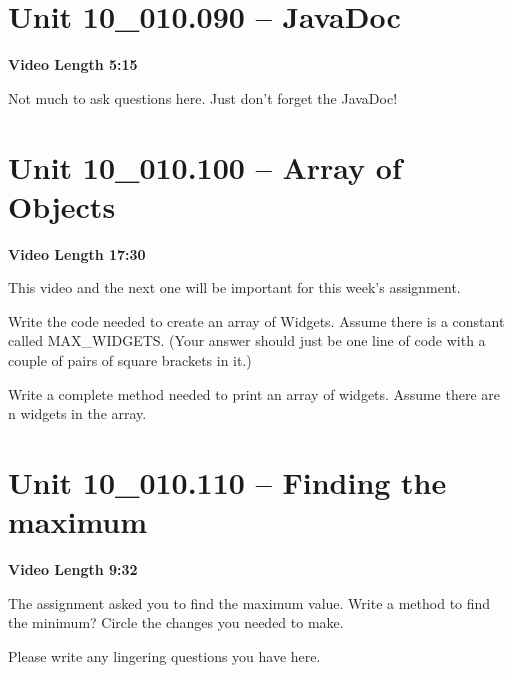\documentclass[letterpaper,12pt]{exam}
\newcommand{\unit}{Unit 10}
\begin{document}
\begin{questions}
\section*{\unit\_010.090 -- JavaDoc} 
\par{\selectfont\textbf{Video Length 5:15}}

Not much to ask questions here.  Just don't forget the JavaDoc!

\section*{\unit\_010.100 -- Array of Objects } 
\par{\selectfont\textbf{Video Length 17:30}}

This video and the next one will be important for this week's assignment.

\begin{samepage}
    \question Write the code needed to create an array of Widgets.  Assume there is a constant called MAX\_WIDGETS. (Your answer should just be one line of code with a couple of pairs of square brackets in it.)
    \vspace{5mm}
\end{samepage}

\begin{samepage}
    \question Write a complete method needed to print an array of widgets.  Assume there are n widgets in the array.
    \vspace{55mm}
\end{samepage}

\section*{\unit\_010.110 -- Finding the maximum} 
\par{\selectfont\textbf{Video Length 9:32}}

\begin{samepage}
    \question The assignment asked you to find the maximum value.  Write a method to find the minimum?  Circle the changes you needed to make.
    \vspace{55mm}
\end{samepage}

Please write any lingering questions you have here.
\end{questions}
\end{document}
